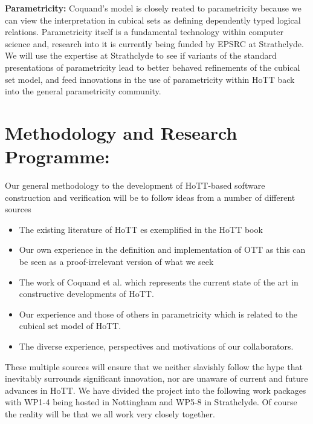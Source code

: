 \documentclass[a4paper,11pt]{article}
\begin{document}
{\bf Parametricity:} Coquand's model is closely reated to
parametricity because we can view the interpretation in cubical sets
as defining dependently typed logical relations.
Parametricity
itself is a fundamental technology within computer science and,
research into it is currently being funded by EPSRC at Strathclyde. We
will use the expertise at Strathclyde to see if variants of the
standard presentations of parametricity lead to better behaved
refinements of the cubical set model, and feed innovations in the use
of parametricity within HoTT back into the general parametricity
community.



\section{Methodology and Research Programme:}
Our general methodology to the development of HoTT-based software
construction and verification will be to follow ideas from a number of
different sources
\begin{itemize}
\item The existing literature of HoTT es exemplified in the HoTT book
\item Our own experience in the definition and implementation of OTT as
  this can be seen as a proof-irrelevant version of what we seek
\item The work of Coquand et al. which represents the current state of
  the art in constructive developments of HoTT.
\item Our experience and those of others in parametricity which is
  related to the cubical set model of HoTT.
\item The diverse experience, perspectives and motivations of our collaborators.
\end{itemize}
These multiple sources will ensure that we neither slavishly follow
the hype that inevitably surrounds significant innovation, nor are
unaware of current and future advances in HoTT. We have divided the
project into the following work packages with WP1-4 being hosted in
Nottingham and WP5-8 in Strathclyde. Of course the reality will be
that we all work very closely together.
 
\end{document}
